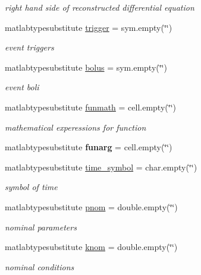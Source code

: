 \begin{DoxyCompactItemize}
\begin{DoxyCompactList}\small\item\em right hand side of reconstructed differential equation \end{DoxyCompactList}\item 
matlabtypesubstitute \hyperlink{class_s_b_m_lode_ae194cb817eae4085f8023885100c68dd}{trigger} = sym.\+empty(\char`\"{}\char`\"{})
\begin{DoxyCompactList}\small\item\em event triggers \end{DoxyCompactList}\item 
matlabtypesubstitute \hyperlink{class_s_b_m_lode_ab9227561ac246ee4b70f9e65c25ffda7}{bolus} = sym.\+empty(\char`\"{}\char`\"{})
\begin{DoxyCompactList}\small\item\em event boli \end{DoxyCompactList}\item 
matlabtypesubstitute \hyperlink{class_s_b_m_lode_a9c1cb6154a226c993c60010300a62e34}{funmath} = cell.\+empty(\char`\"{}\char`\"{})
\begin{DoxyCompactList}\small\item\em mathematical experessions for function \end{DoxyCompactList}\item 
\hypertarget{class_s_b_m_lode_ae416c192e9400c4554793f3962a7c7ac}{}matlabtypesubstitute {\bfseries funarg} = cell.\+empty(\char`\"{}\char`\"{})\label{class_s_b_m_lode_ae416c192e9400c4554793f3962a7c7ac}

\item 
matlabtypesubstitute \hyperlink{class_s_b_m_lode_ac38903669f208bc49c971c7a69f62225}{time\+\_\+symbol} = char.\+empty(\char`\"{}\char`\"{})
\begin{DoxyCompactList}\small\item\em symbol of time \end{DoxyCompactList}\item 
matlabtypesubstitute \hyperlink{class_s_b_m_lode_aab64bc684d10326610cc4e866d7ed65c}{pnom} = double.\+empty(\char`\"{}\char`\"{})
\begin{DoxyCompactList}\small\item\em nominal parameters \end{DoxyCompactList}\item 
matlabtypesubstitute \hyperlink{class_s_b_m_lode_a744d356a79732f2b65d02f220c580dd4}{knom} = double.\+empty(\char`\"{}\char`\"{})
\begin{DoxyCompactList}\small\item\em nominal conditions \end{DoxyCompactList}\end{DoxyCompactItemize}


